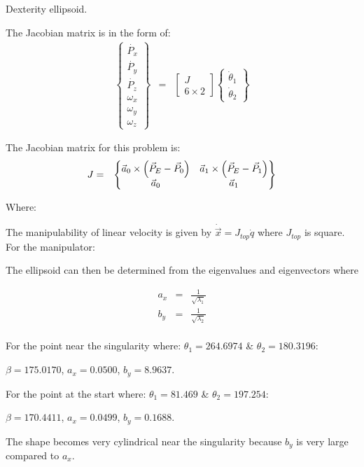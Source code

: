 Dexterity ellipsoid.

The Jacobian matrix is in the form of:
\begin{eqnarray}
\begin{Bmatrix}
\dot{P_x} \\
\dot{P_y} \\
\dot{P_z} \\
\omega_x \\
\omega_y \\
\omega_z
\end{Bmatrix} &=&
\begin{bmatrix}
J \\
6 \times 2
\end{bmatrix}
\begin{Bmatrix}
\dot{\theta}_1 \\
\dot{\theta}_2
\end{Bmatrix}
\end{eqnarray}

The Jacobian matrix for this problem is:
\begin{eqnarray}
J&=&\begin{Bmatrix}
\vec{a}_0 \times \left(\vec{P}_E-\vec{P}_{0}\right) 	&
\vec{a}_1 \times \left(\vec{P}_E-\vec{P}_{1}\right) 	\\
\vec{a}_0& \vec{a}_1 \\
\end{Bmatrix}
\end{eqnarray}

Where: 


The manipulability of linear velocity is given by $\dot{\vec{x}}=J_{top}\dot{q}$ where $J_{top}$ is square. For the manipulator:


The ellipsoid can then be determined from the eigenvalues and eigenvectors where 

\begin{eqnarray}
a_x&=&\frac{1}{\sqrt{\lambda_1}} \\
b_y&=&\frac{1}{\sqrt{\lambda_2}}  \\
\end{eqnarray}

For the point near the singularity where: $\theta_1=264.6974$ \& $\theta_2=180.3196$:

$\beta=175.0170$, $a_x=0.0500$, $b_y=8.9637$.

For the point at the start where:  $\theta_1=81.469$ \& $\theta_2=197.254$:

$\beta=170.4411$, $a_x=0.0499$, $b_y=0.1688$.

The shape becomes very cylindrical near the singularity because $b_y$ is very large compared to $a_x$.